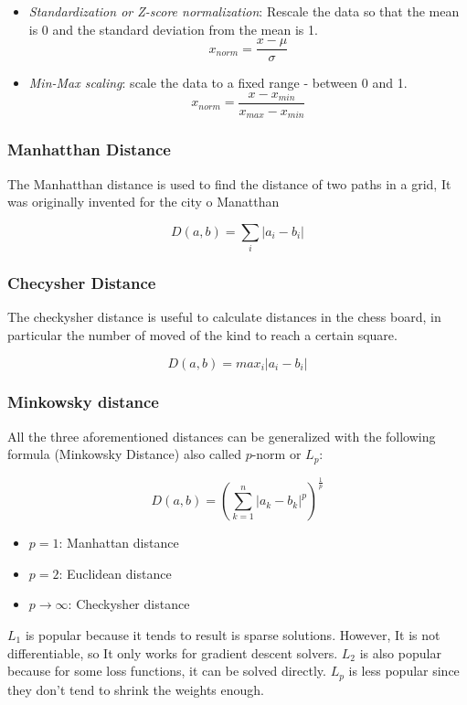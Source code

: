 \documentclass{article}
\begin{document}
\begin{itemize}
\tightlist
\item
  \emph{Standardization or Z-score normalization}: Rescale the data so
  that the mean is 0 and the standard deviation from the mean is 1.
  \[x_{norm}=\frac{x-\mu}{\sigma}\]
\item
  \emph{Min-Max scaling}: scale the data to a fixed range - between 0
  and 1. \[x_{norm}=\frac{x-x_{min}}{x_{max}-x_{min}}\]
\end{itemize}

\subsubsection{Manhatthan Distance}\label{manhatthan-distance}

The Manhatthan distance is used to find the distance of two paths in a
grid, It was originally invented for the city o Manatthan

\[D(a, b)=\sum_i |a_i - b_i|\]

\subsubsection{Checysher Distance}\label{checysher-distance}

The checkysher distance is useful to calculate distances in the chess
board, in particular the number of moved of the kind to reach a certain
square.

\[D(a, b)=max_i|a_i-b_i|\]

\subsubsection{Minkowsky distance}\label{minkowsky-distance}

All the three aforementioned distances can be generalized with the
following formula (Minkowsky Distance) also called \(p\)-norm or
\(L_p\):

\[D(a, b) = (\sum_{k=1}^{n} |a_k - b_k|^p)^{\frac{1}{p}}\]

\begin{itemize}
\tightlist
\item
  \(p=1\): Manhattan distance
\item
  \(p=2\): Euclidean distance
\item
  \(p\to\infty\): Checkysher distance
\end{itemize}

\(L_1\) is popular because it tends to result is sparse solutions.
However, It is not differentiable, so It only works for gradient descent
solvers. \(L_2\) is also popular because for some loss functions, it can
be solved directly. \(L_p\) is less popular since they don't tend to
shrink the weights enough.
\end{document}
